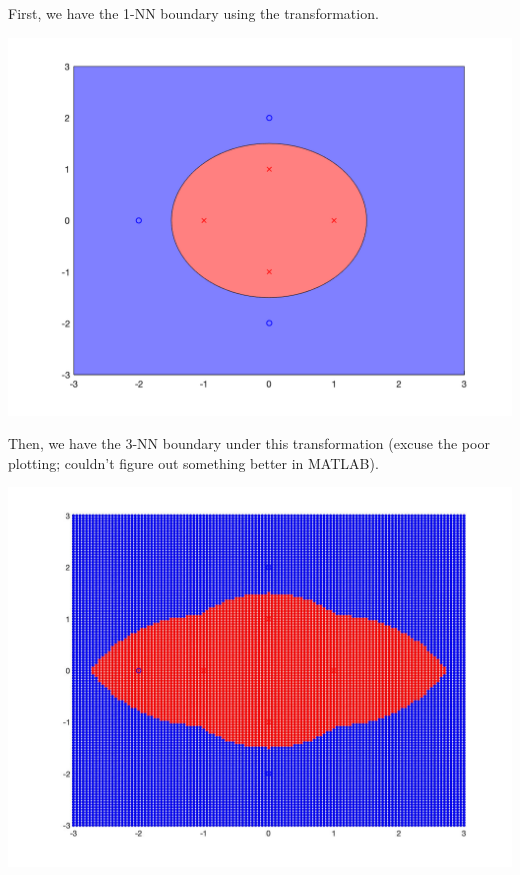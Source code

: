 \documentclass{article}
\begin{document}
\begin{enumerate}[(a)]
    First, we have the 1-NN boundary using the transformation.

    \begin{center}
    \includegraphics[width=\textwidth]{61b1nn.png}
    \end{center}

    Then, we have the 3-NN boundary under this transformation (excuse the poor plotting; couldn't
    figure out something better in MATLAB).

    \begin{center}
    \includegraphics[width=\textwidth]{61b3nn.jpg}
    \end{center}

\end{enumerate}
\end{document}
